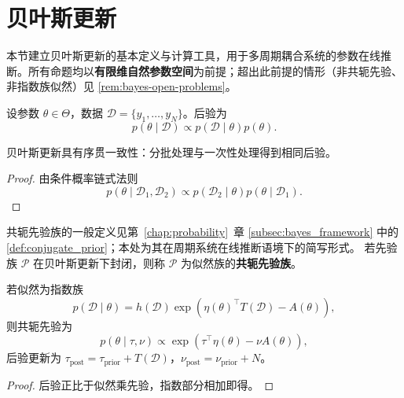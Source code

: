 \section{贝叶斯更新}\label{sec:ps_bayes_update}

\begin{remark}[本节定位]\label{rem:bayes-positioning}
本节建立贝叶斯更新的基本定义与计算工具，用于多周期耦合系统的参数在线推断。所有命题均以\textbf{有限维自然参数空间}为前提；超出此前提的情形（非共轭先验、非指数族似然）见 \cref{rem:bayes-open-problems}。
\end{remark}

\begin{definition}[贝叶斯更新]\label{def:bayes-update}
设参数 $\theta\in\Theta$，数据 $\mathcal{D}=\{y_1,\dots,y_N\}$。后验为
\[
p(\theta\mid\mathcal{D})\propto p(\mathcal{D}\mid\theta)p(\theta).
\]
\end{definition}

\begin{proposition}[序贯一致性]\label{prop:bayes-sequential}
贝叶斯更新具有序贯一致性：分批处理与一次性处理得到相同后验。
\end{proposition}

\begin{proof}
由条件概率链式法则
\[
p(\theta\mid\mathcal{D}_1,\mathcal{D}_2)
\propto p(\mathcal{D}_2\mid\theta)p(\theta\mid\mathcal{D}_1).
\]
\end{proof}

\begin{definition}[共轭先验]\label{def:conjugate-prior-ps}
共轭先验族的一般定义见第~\ref{chap:probability}~章 \cref{subsec:bayes_framework} 中的 \cref{def:conjugate_prior}；本处为其在周期系统在线推断语境下的简写形式。
若先验族 $\mathcal{P}$ 在贝叶斯更新下封闭，则称 $\mathcal{P}$ 为似然族的\textbf{共轭先验族}。
\end{definition}

\begin{proposition}[指数族共轭先验]\label{prop:exponential-conjugate}
若似然为指数族
\[
p(\mathcal{D}\mid\theta)=h(\mathcal{D})\exp(\eta(\theta)^\top T(\mathcal{D})-A(\theta)),
\]
则共轭先验为
\[
p(\theta\mid\tau,\nu)\propto\exp(\tau^\top\eta(\theta)-\nu A(\theta)),
\]
后验更新为 $\tau_{\text{post}}=\tau_{\text{prior}}+T(\mathcal{D})$，$\nu_{\text{post}}=\nu_{\text{prior}}+N$。
\end{proposition}

\begin{proof}
后验正比于似然乘先验，指数部分相加即得。
\end{proof}

